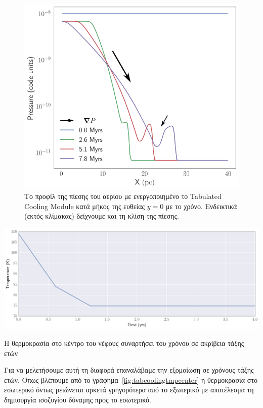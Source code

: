 \documentclass[article,a4paper,11.2pt]{memoir}
\numberwithin{equation}{subsection}
\begin{document}
\begin{figure}[h]
\begin{adjustwidth*}{-5cm}{-0cm}
		\includegraphics[width=1\linewidth]{DataImages/TabCoolingPRSprofile-gradP}
		\caption{Το προφίλ της πίεσης του αερίου με ενεργοποιημένο το Tabulated Cooling Module κατά μήκος της ευθείας $y=0$ με το χρόνο. Ενδεικτικά (εκτός κλίμακας) δείχνουμε και τη κλίση της πίεσης.}
		\label{fig:tabcoolingprsprofile-gradp}
	\end{adjustwidth*}
	\end{figure}

	
\begin{marginfigure}
	\includegraphics[width=1\linewidth]{DataImages/TabCoolingTMPcenter}
	\caption{Η θερμοκρασία στο κέντρο του νέφους συναρτήσει του χρόνου σε ακρίβεια τάξης ετών}
	\label{fig:tabcoolingtmpcenter}
\end{marginfigure}
	
	Για να μελετήσουμε αυτή τη διαφορά επαναλάβαμε την εξομοίωση σε χρόνους τάξης ετών. Όπως βλέπουμε από το γράφημα~\ref{fig:tabcoolingtmpcenter} η θερμοκρασία στο εσωτερικό όντως μειώνεται αρκετά γρηγορότερα από το εξωτερικό με αποτέλεσμα τη δημιουργία ισοζυγίου δύναμης προς το εσωτερικό.
	
\end{document}
